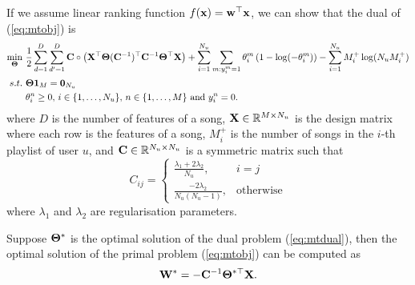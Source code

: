 If we assume linear ranking function $f(\mathbf{x}) = \mathbf{w}^\top \mathbf{x}$, we can show that the dual of (\ref{eq:mtobj}) is
\begin{equation}
\label{eq:mtdual}
\begin{aligned}
\min_{\mathbf{\Theta}} \ & \frac{1}{2} \sum_{d=1}^{D} \sum_{d'=1}^{D} \mathbf{C} \circ \left( \mathbf{X}^\top \mathbf{\Theta} (\mathbf{C}^{-1})^\top \mathbf{C}^{-1} \mathbf{\Theta}^\top \mathbf{X} \right) 
    + \sum_{i = 1}^{N_u} \sum_{m: y_i^m = 1} \theta_i^m \left( 1 - \log(-\theta_i^m) \right) - \sum_{i=1}^{N_u} M_i^+ \log(N_u M_i^+) \\
s.t. \ & \mathbf{\Theta} \mathbf{1}_M = \mathbf{0}_{N_u} \\
       & \theta_i^n \ge 0, \, i \in \{1,\dots,N_u\}, \, n \in \{1,\dots,M\} \ \mathrm{and} \ y_i^n = 0.
\end{aligned}
\end{equation}
where $D$ is the number of features of a song, 
$\mathbf{X} \in \mathbb{R}^{M \times N_u}$ is the design matrix where each row is the features of a song,
$M_i^+$ is the number of songs in the $i$-th playlist of user $u$,
and $\mathbf{C} \in \mathbb{R}^{N_u \times N_u}$ is a symmetric matrix such that
\begin{equation*}
C_{ij} = \begin{cases}
\frac{\lambda_1 + 2\lambda_2}{N_u}, & i = j \\
\frac{-2\lambda_2}{N_u (N_u - 1)},  & \mathrm{otherwise}
\end{cases}
\end{equation*}
where $\lambda_1$ and $\lambda_2$ are regularisation parameters.

Suppose $\mathbf{\Theta}^*$ is the optimal solution of the dual problem (\ref{eq:mtdual}), 
then the optimal solution of the primal problem (\ref{eq:mtobj}) can be computed as
\begin{equation*}
\mathbf{W}^* = -\mathbf{C}^{-1} \mathbf{\Theta}^{*\top} \mathbf{X}.
\end{equation*}

%


